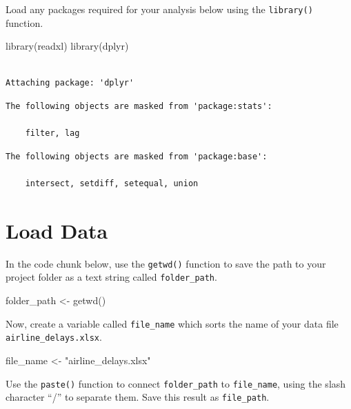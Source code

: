 \documentclass[
  letterpaper,
  DIV=11,
  numbers=noendperiod]{scrartcl}
\newenvironment{Shaded}{\begin{snugshade}}{\end{snugshade}}
\newcommand{\FunctionTok}[1]{\textcolor[rgb]{0.28,0.35,0.67}{#1}}
\newcommand{\NormalTok}[1]{\textcolor[rgb]{0.00,0.23,0.31}{#1}}
\newcommand{\OtherTok}[1]{\textcolor[rgb]{0.00,0.23,0.31}{#1}}
\newcommand{\StringTok}[1]{\textcolor[rgb]{0.13,0.47,0.30}{#1}}
\begin{document}
Load any packages required for your analysis below using the
\texttt{library()} function.

\begin{Shaded}
\begin{Highlighting}[]
\FunctionTok{library}\NormalTok{(readxl)}
\FunctionTok{library}\NormalTok{(dplyr)}
\end{Highlighting}
\end{Shaded}

\begin{verbatim}

Attaching package: 'dplyr'
\end{verbatim}

\begin{verbatim}
The following objects are masked from 'package:stats':

    filter, lag
\end{verbatim}

\begin{verbatim}
The following objects are masked from 'package:base':

    intersect, setdiff, setequal, union
\end{verbatim}

\section*{Load Data}\label{load-data}

In the code chunk below, use the \texttt{getwd()} function to save the
path to your project folder as a text string called
\texttt{folder\_path}.

\begin{Shaded}
\begin{Highlighting}[]
\NormalTok{folder\_path }\OtherTok{\textless{}{-}} \FunctionTok{getwd}\NormalTok{()}
\end{Highlighting}
\end{Shaded}

Now, create a variable called \texttt{file\_name} which sorts the name
of your data file \texttt{airline\_delays.xlsx}.

\begin{Shaded}
\begin{Highlighting}[]
\NormalTok{file\_name }\OtherTok{\textless{}{-}} \StringTok{"airline\_delays.xlsx"}
\end{Highlighting}
\end{Shaded}

Use the \texttt{paste()} function to connect \texttt{folder\_path} to
\texttt{file\_name}, using the slash character ``/'' to separate them.
Save this result as \texttt{file\_path}.
\end{document}

